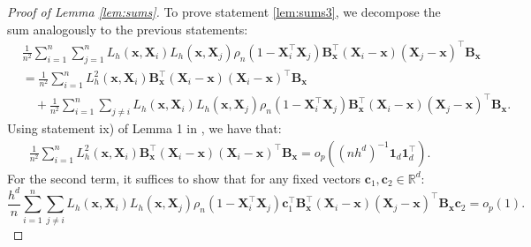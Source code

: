 \documentclass[12pt]{report} %
\newcommand{\bX}{\mathbf{X}}
\newcommand{\bx}{\mathbf{x}}
\newcommand{\bc}{\mathbf{c}}
\newcommand{\bB}{\mathbf{B}}
\begin{document}
\begin{proof}[Proof of Lemma \ref{lem:sums}]
To prove statement \ref{lem:sums3}, we decompose the sum analogously to the previous statements:
\begin{align}
&\frac{1}{n^2}
\sum_{i=1}^n \sum_{j=1}^n
L_h(\bx,\bX_i)
L_h(\bx,\bX_j)
\rho_n(1-\bX_i^\top\bX_j)
\bB_{\bx}^\top(\bX_i-\bx)
(\bX_j-\bx)^\top
\bB_{\bx}
\nonumber\\
&=
\frac{1}{n^2}
\sum_{i=1}^n
L_h^2(\bx,\bX_i)
\bB_{\bx}^\top(\bX_i-\bx)
(\bX_i-\bx)^\top
\bB_{\bx}
\nonumber\\
&\quad+
\frac{1}{n^2}
\sum_{i=1}^n \sum_{j\ne i}
L_h(\bx,\bX_i)
L_h(\bx,\bX_j)
\rho_n(1-\bX_i^\top\bX_j)
\bB_{\bx}^\top(\bX_i-\bx)
(\bX_j-\bx)^\top
\bB_{\bx}.
\label{eq:lemmaiii}
\end{align}
Using statement ix) of Lemma 1 in \citet{Garcia-Portugues2016}, we have that:
\begin{align}
\frac{1}{n^2} \sum_{i=1}^n L_h^2\left(\bx, \bX_i\right) 
\bB_{\bx}^\top\left(\bX_i -\bx\right)\left(\bX_i-\bx\right)^\top\bB_{\bx}
= o_p\!\left(\left(nh^d\right)^{-1}\mathbf{1}_d\mathbf{1}_d^\top\right).
\label{eq:lemmaiii1}
\end{align}
For the second term, it suffices to show that for any fixed vectors $\bc_1, \bc_2 \in \mathbb{R}^d$:
\begin{equation*}
\frac{h^d}{n} \sum_{i=1}^n\sum_{j\neq i} 
L_h\left(\bx, \bX_i\right)L_h\left(\bx, \bX_j\right)
\rho_n\left(1-\bX_i^\top\bX_j\right)
\bc_1^\top\bB_{\bx}^\top\left(\bX_i -\bx\right)\left(\bX_j-\bx\right)^\top\bB_{\bx}\bc_2
= o_p\!\left(1\right).
\end{equation*}



\end{proof}
\end{document}
